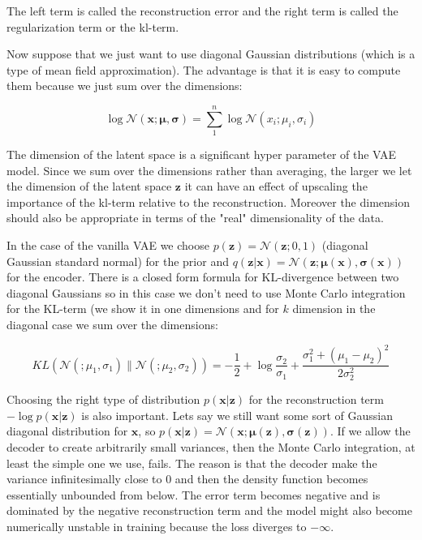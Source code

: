 \documentclass[11pt, a4paper]{report}
\theoremstyle{plain}
\theoremstyle{definition}
\theoremstyle{remark}
\newcommand{\x}{\mathbf{x}}
\newcommand{\z}{\mathbf{z}}
\newcommand{\NN}{\mathcal{N}}
\newcommand{\bv}[1]{\boldsymbol{#1}}
\begin{document}
The left term is called the reconstruction error and the 
right term is called the regularization term or the kl-term.


Now suppose that we just want to use diagonal Gaussian distributions (which is
a type of mean field approximation).
The advantage is that it is easy to compute them because we just sum over the
dimensions:

\begin{equation}
\label{eq:diagnormal}
\log \NN(\x ; \bv{\mu}, \bv{\sigma}) = 
\sum_1^n \log \NN(x_i ; \mu_i, \sigma_i)
\end{equation}

The dimension of the latent space is a significant hyper parameter of the VAE
model.
Since we sum over the dimensions rather than averaging,
the larger we let the dimension of the latent space $\z$ 
it can have an effect of upscaling the importance of the kl-term relative to the
reconstruction.
Moreover the dimension should also be appropriate in terms of the "real"
dimensionality of the data.

In the case of the vanilla VAE we choose $p(\z) = \NN(\z;0,1)$ (diagonal
Gaussian standard normal) for the prior and 
$q(\z | \x) = \NN(\z ; \bv{\mu}(\x), \bv{\sigma}(\x))$ for the encoder.
There is a closed form formula for KL-divergence between two diagonal Gaussians
so in this case we don't need to use Monte Carlo integration for the KL-term
(we show it in one dimensions and for $k$ dimension in the diagonal case
we sum over the dimensions:

\begin{equation}
\label{eq:kldivnormal}
KL(\NN(;\mu_1, \sigma_1) \| \NN(;\mu_2, \sigma_2)) = 
-\frac{1}{2} + \log \frac{\sigma_2}{\sigma_1}
+ \frac{\sigma_1^2 + (\mu_1 - \mu_2)^2}{2 \sigma_2^2}
\end{equation}

Choosing the right type of distribution $p(\x | \z)$ for the reconstruction term
$-\log p (\x | \z)$ is also important.
Lets say we still want some sort of Gaussian diagonal distribution for $\x$,
so $p(\x | \z) = \NN(\x ; \bv{\mu}(\z), \bv{\sigma}(\z))$.
If we allow the decoder to create arbitrarily small variances, then 
the Monte Carlo integration, at least the simple one we use, fails.
The reason is that the decoder make the variance infinitesimally close to $0$ and
then the density function becomes essentially unbounded from below. The error term becomes
negative and is dominated by the negative reconstruction term and the model
might also become numerically unstable in training because the loss diverges to
$-\infty$.
\end{document}
